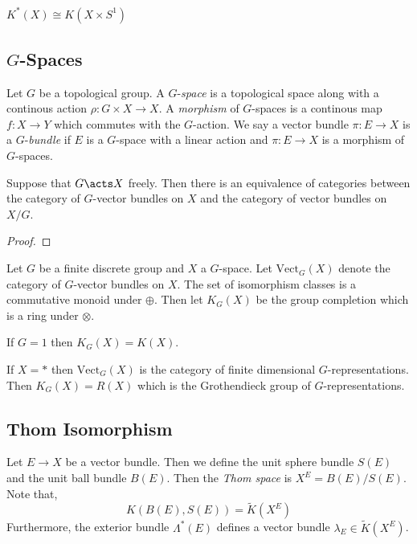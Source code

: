 \documentclass[12pt]{extarticle}
\newcommand{\Vect}{\mathrm{Vect}}
\begin{document}
\begin{prop}
$K^*(X) \cong K(X \times S^1)$ 
\end{prop}

\subsection{$G$-Spaces}

\begin{defn}
Let $G$ be a topological group. A $G$-\textit{space} is a topological space along with a continous action $\rho : G \times X \to X$. A \textit{morphism} of $G$-spaces is a continous map $f : X \to Y$ which commutes with the $G$-action. We say a vector bundle $\pi : E \to X$ is a $G$-\textit{bundle} if $E$ is a $G$-space with a linear action and $\pi : E \to X$ is a morphism of $G$-spaces.
\end{defn}

\begin{prop}
Suppose that $G \acts X$ freely. Then there is an equivalence of categories between the category of $G$-vector bundles on $X$ and the category of vector bundles on $X / G$. 
\end{prop}

\begin{proof}

\end{proof}

\begin{defn}
Let $G$ be a finite discrete group and $X$ a $G$-space. Let $\Vect_G(X)$ denote the category of $G$-vector bundles on $X$. The set of isomorphism classes is a commutative monoid under $\oplus$. Then let $K_G(X)$ be the group completion which is a ring under $\otimes$.
\end{defn}

\begin{example}
If $G = 1$ then $K_G(X) = K(X)$. 
\end{example}

\begin{example}
If $X = *$ then $\Vect_G(X)$ is the category of finite dimensional $G$-representations. Then $K_G(X) = R(X)$ which is the Grothendieck group of $G$-representations. 
\end{example}

\subsection{Thom Isomorphism} 

\begin{defn}
Let $E \to X$ be a vector bundle. Then we define the unit sphere bundle $S(E)$ and the unit ball bundle $B(E)$. Then the \textit{Thom space} is $X^E = B(E) / S(E)$. Note that,
\[ K(B(E), S(E)) = \tilde{K}(X^E) \]
Furthermore, the exterior bundle $\Lambda^*(E)$ defines a vector bundle $\lambda_E \in \tilde{K}(X^E)$. 
\end{defn}
\end{document}
